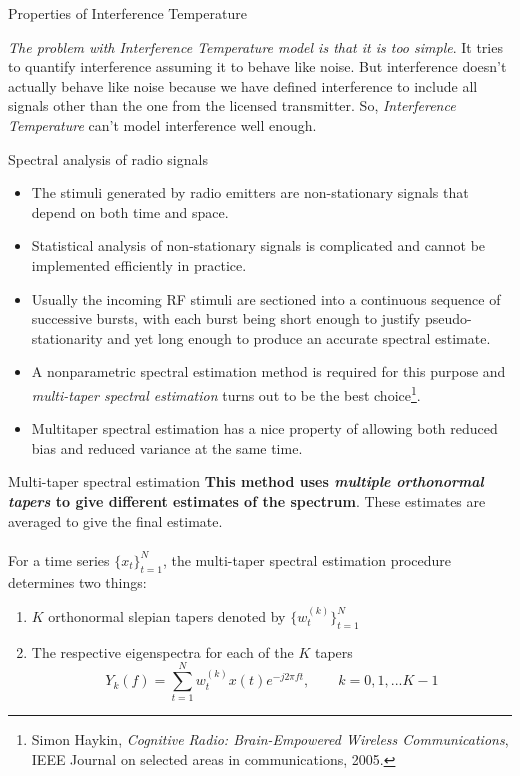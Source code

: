 \documentclass[mathserif]{beamer}
\begin{document}
\begin{frame}{Properties of Interference Temperature}

\emph{The problem with Interference Temperature model is that it is too simple}. It tries to quantify interference assuming it to behave like noise. But interference doesn't actually behave like noise because we have defined interference to include all signals other than the one from the licensed transmitter. So, \emph{Interference Temperature} can't model interference well enough.

\end{frame}

\begin{frame}{Spectral analysis of radio signals}


\begin{itemize}

	\pause
	\item The stimuli generated by radio emitters are non-stationary signals that depend on both time and space.
	\pause
	\item Statistical analysis of non-stationary signals is complicated and cannot be implemented efficiently in practice. 
	\pause
	\item Usually the incoming RF stimuli are sectioned into a continuous sequence of successive bursts, with each burst being short enough to justify pseudo-stationarity and yet long enough to produce an accurate spectral estimate.
	\pause
	\item A nonparametric spectral estimation method is required for this purpose and \emph{multi-taper spectral estimation} turns out to be the best choice\footnote{Simon Haykin, \emph{Cognitive Radio: Brain-Empowered Wireless Communications}, IEEE Journal on selected areas in communications, 2005.}. 
	\pause
	\item Multitaper spectral estimation has a nice property of allowing both reduced bias and reduced variance at the same time.

\end{itemize}
\end{frame}

\begin{frame}{Multi-taper spectral estimation}
\textbf{This method uses \emph{multiple orthonormal tapers} to give different estimates of the spectrum}. These estimates are averaged to give the final estimate. \\~\\


For a time series $\{x_t\}_{t=1}^N$, the multi-taper spectral estimation procedure determines two things:
\begin{enumerate}
    \item $K$ orthonormal slepian tapers denoted by $\{w_t^{(k)}\}_{t=1}^{N}$
    \item The respective eigenspectra for each of the $K$ tapers
\begin{equation*}
   Y_k(f) = \sum_{t=1}^N w_t^{(k)} x(t) e^{-j2\pi{}ft}, \qquad k = 0, 1, ...K-1
\end{equation*}
\end{enumerate}

\end{frame}
\end{document}
